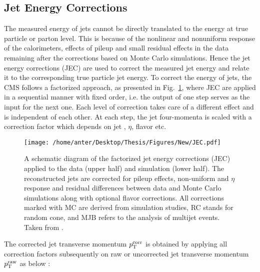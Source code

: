 \subsection{Jet Energy Corrections}
\label{sec:jet_corrections}
The measured energy of jets cannot be directly translated to the energy at true particle or parton level. This is because of the nonlinear and nonuniform response of the calorimeters, effects of pileup and small residual effects in the data remaining after the corrections based on Monte Carlo simulations. Hence the jet energy corrections (JEC) \cite{Chatrchyan:2011ds, Khachatryan:2016kdb} are used to correct the measured jet energy and relate it to the corresponding true particle jet energy. To correct the energy of jets, the CMS follows a factorized approach, as presented in Fig.~\ref{fig:jec}, where JEC are applied in a sequential manner with fixed order, i.e. the output of one step serves as the input for the next one. Each level of correction takes care of a different effect and is independent of each other. At each step, the jet four-momenta is scaled with a correction factor which depends on jet \pt, $\eta$, flavor etc.

\begin{figure}[!h]
 \begin{center}
 \vspace*{4mm} 
 \hspace*{-11mm}
 \texttt{[image: /home/anter/Desktop/Thesis/Figures/New/JEC.pdf]}\\
 \vspace*{5mm}
 \caption[A schematic diagram of the factorized jet energy corrections (JEC).]{A schematic diagram of the factorized jet energy corrections (JEC) applied to the data (upper half) and simulation (lower half). The reconstructed jets are corrected for pileup effects, non-uniform \pt and $\eta$ response and residual differences between data and Monte Carlo simulations along with optional flavor corrections. All corrections marked with MC are derived from simulation studies, RC stands for random cone, and MJB refers to the analysis of multijet events. Taken from \cite{Khachatryan:2016kdb}.}
 \label{fig:jec}
 \end{center}
\end{figure}

The corrected jet transverse momentum $p^{\rm corr}_{\rm T}$ is obtained by applying all correction factors subsequently on raw or uncorrected jet transverse momentum $p^{\rm raw}_{\rm T}$ as below :

